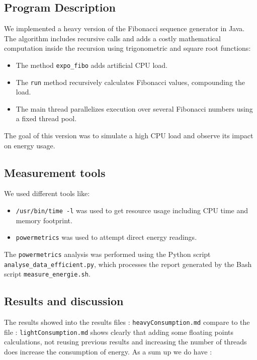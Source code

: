 \documentclass[twocolumn,10pt]{article}
\begin{document}
\subsection{Program Description}

We implemented a heavy version of the Fibonacci sequence generator in Java. The algorithm includes recursive calls and adds a costly mathematical computation inside the recursion using trigonometric and square root functions:

\begin{itemize}
    \item The method \texttt{expo\_fibo} adds artificial CPU load.
    \item The \texttt{run} method recursively calculates Fibonacci values, compounding the load.
    \item The main thread parallelizes execution over several Fibonacci numbers using a fixed thread pool.
\end{itemize}

The goal of this version was to simulate a high CPU load and observe its impact on energy usage.

\subsection{Measurement tools}

We used different tools like:

\begin{itemize}
    \item \texttt{/usr/bin/time -l} was used to get resource usage including CPU time and memory footprint. 
    \item \texttt{powermetrics} was used to attempt direct energy readings.
\end{itemize}

The \texttt{powermetrics} analysis was performed using the Python script \texttt{analyse\_data\_efficient.py}, which processes the report generated by the Bash script \texttt{measure\_energie.sh}.

\subsection{Results and discussion}

The results showed into the results files : \texttt{heavyConsumption.md} compare to the file : \texttt{lightConsumption.md} shows clearly that adding some floating points calculations, not reusing previous results and increasing the number of threads does increase the consumption of energy. As a sum up we do have :
\end{document}
